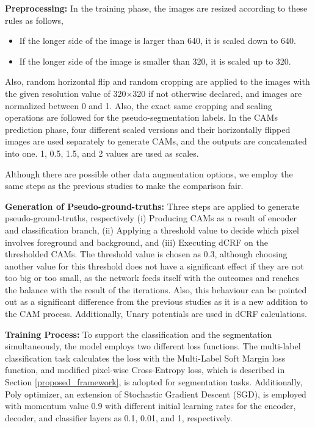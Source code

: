 \documentclass[sn-mathphys]{sn-jnl}
\theoremstyle{thmstyleone}
\theoremstyle{thmstyletwo}\newtheorem{example}{Example}\newtheorem{remark}{Remark}
\theoremstyle{thmstylethree}\newtheorem{definition}{Definition}
\begin{document}
\textbf{Preprocessing:} In the training phase, the images are resized according to these rules as follows,
\begin{itemize}
    \item If the longer side of the image is larger than 640, it is scaled down to 640.
    \item If the longer side of the image is smaller than 320, it is scaled up to 320.
\end{itemize}

Also, random horizontal flip and random cropping are applied to the images with the given resolution value of 320×320 if not otherwise declared, and images are normalized between 0 and 1. Also, the exact same cropping and scaling operations are followed for the pseudo-segmentation labels. In the CAMs prediction phase, four different scaled versions and their horizontally flipped images are used separately to generate CAMs, and the outputs are concatenated into one. 1, 0.5, 1.5, and 2 values are used as scales. 

Although there are possible other data augmentation options, we employ the same steps as the previous studies to make the comparison fair. 

\textbf{Generation of Pseudo-ground-truths:} Three steps are applied to generate pseudo-ground-truths, respectively (i) Producing CAMs as a result of encoder and classification branch, (ii) Applying a threshold value to decide which pixel involves foreground and background, and (iii) Executing dCRF on the thresholded CAMs. The threshold value is chosen as 0.3, although choosing another value for this threshold does not have a significant effect if they are not too big or too small, as the network feeds itself with the outcomes and reaches the balance with the result of the iterations. Also, this behaviour can be pointed out as a significant difference from the previous studies as it is a new addition to the CAM process. Additionally, Unary potentials are used in dCRF calculations.

\textbf{Training Process:} To support the classification and the segmentation simultaneously, the model employs two different loss functions. The multi-label classification task calculates the loss with the Multi-Label Soft Margin loss function, and modified pixel-wise Cross-Entropy loss, which is described in Section \ref{proposed_framework}, is adopted for segmentation tasks. Additionally, Poly optimizer, an extension of Stochastic Gradient Descent (SGD), is employed with momentum value 0.9 with different initial learning rates for the encoder, decoder, and classifier layers as 0.1, 0.01, and 1, respectively. 
\end{document}
